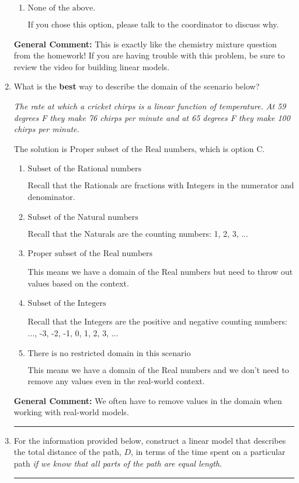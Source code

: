 \documentclass{extbook}[14pt]
\newcommand{\litem}[1]{\item #1

\rule{\textwidth}{0.4pt}}
\begin{document}
\begin{enumerate}
{\begin{enumerate}[label=\Alph*.]
This would be correct if the question asked you to construct the cost model in terms of the weight of the low-quality bean.
\item \( \text{None of the above.} \)

If you chose this option, please talk to the coordinator to discuss why.
\end{enumerate}

\textbf{General Comment:} This is exactly like the chemistry mixture question from the homework! If you are having trouble with this problem, be sure to review the video for building linear models.
}
\litem{
What is the \textbf{best} way to describe the domain of the scenario below?

\begin{center}
    \textit{ The rate at which a cricket chirps is a linear function of temperature. At 59 degrees F they make 76 chirps per minute and at 65 degrees F they make 100 chirps per minute. }
\end{center}
The solution is \( \text{Proper subset of the Real numbers} \), which is option C.\begin{enumerate}[label=\Alph*.]
\item \( \text{Subset of the Rational numbers} \)

Recall that the Rationals are fractions with Integers in the numerator and denominator.
\item \( \text{Subset of the Natural numbers} \)

Recall that the Naturals are the counting numbers: 1, 2, 3, ...
\item \( \text{Proper subset of the Real numbers} \)

This means we have a domain of the Real numbers but need to throw out values based on the context.
\item \( \text{Subset of the Integers} \)

Recall that the Integers are the positive and negative counting numbers: ..., -3, -2, -1, 0, 1, 2, 3, ... 
\item \( \text{There is no restricted domain in this scenario} \)

This means we have a domain of the Real numbers and we don't need to remove any values even in the real-world context.
\end{enumerate}

\textbf{General Comment:} We often have to remove values in the domain when working with real-world models.
}
\litem{
For the information provided below, construct a linear model that describes the total distance of the path, $D$, in terms of the time spent on a particular path \textit{if we know that all parts of the path are equal length}.

}
\end{enumerate}
\end{document}
